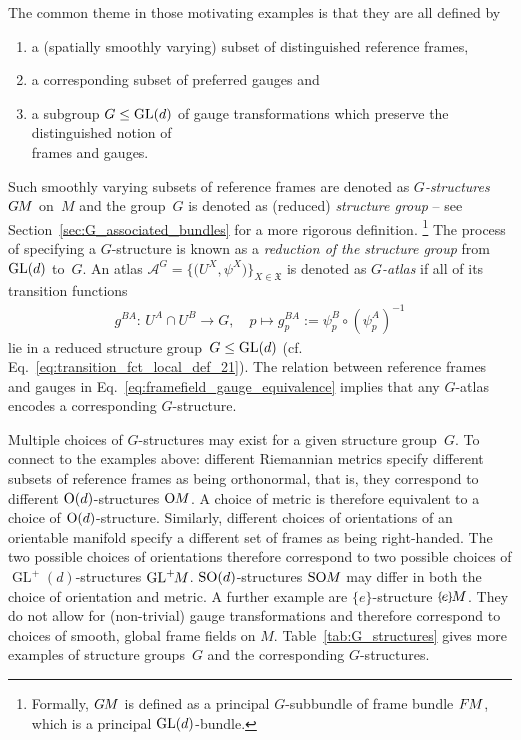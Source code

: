 \begin{samepage}
The common theme in those motivating examples is that they are all defined by
\begin{enumerate}
    \item a (spatially smoothly varying) subset of distinguished reference frames,
    \item a corresponding subset of preferred gauges and
    \item a subgroup $G \leq \operatorname{GL}(d)$ of gauge transformations which preserve the distinguished notion of\\ frames and gauges.
\end{enumerate}
\end{samepage}
Such smoothly varying subsets of reference frames are denoted as \emph{$G$-structures}~$G\mkern-1.4muM$ on~$M$
and the group~$G$ is denoted as (reduced) \emph{structure group}
-- see Section~\ref{sec:G_associated_bundles} for a more rigorous definition.%
\footnote{
    Formally, $G\mkern-1.4muM$ is defined as a principal $G$-subbundle of frame bundle $F\mkern-1.5muM$, which is a principal $\operatorname{GL}(d)$-bundle.
}
The process of specifying a $G$-structure is known as a \emph{reduction of the structure group} from $\operatorname{GL}(d)$ to~$G$.
An atlas ${\mathscr{A}^G = \big\{\! \big(U^X, \psi^X\big) \!\big\}_{X\in \mathfrak{X}}}$ is denoted as $G$\emph{-atlas} if all of its transition functions
\begin{align}\label{eq:transition_fct_local_def_21_G_atlas}
    g^{BA}\!:\, U^A\cap U^B\to G, \quad p \mapsto g_p^{BA} := \psi_p^B \circ \left(\psi_p^A\right)^{-1}
\end{align}
lie in a reduced structure group~$G \leq \operatorname{GL}(d)$ (cf. Eq.~\eqref{eq:transition_fct_local_def_21}).
The relation between reference frames and gauges in Eq.~\eqref{eq:framefield_gauge_equivalence} implies that any $G$-atlas encodes a corresponding $G$-structure.


Multiple choices of $G$-structures may exist for a given structure group~$G$.
To connect to the examples above:
different Riemannian metrics specify different subsets of reference frames as being orthonormal, that is, they correspond to different $\operatorname{O}(d)$-structures $\operatorname{O}\mkern-3.6muM$.
A choice of metric is therefore equivalent to a choice of $\operatorname{O}(d)$-structure.
Similarly, different choices of orientations of an orientable manifold specify a different set of frames as being right-handed.
The two possible choices of orientations therefore correspond to two possible choices of $\operatorname{GL}^+(d)$-structures $\operatorname{GL}^+\mkern-5muM$.
$\operatorname{SO}(d)$-structures $\operatorname{SO}\mkern-3.6muM$ may differ in both the choice of orientation and metric.
A further example are $\{e\}$-structure $\eM$.
They do not allow for (non-trivial) gauge transformations and therefore correspond to choices of smooth, global frame fields on $M$.
Table~\ref{tab:G_structures} gives more examples of structure groups~$G$ and the corresponding $G$-structures.


